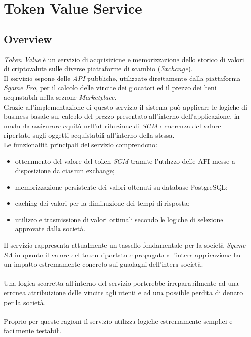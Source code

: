 \documentclass[11pt]{thesistemp}
\begin{document}
\section{Token Value Service}

\subsection{Overview}

\textit{Token Value} è un servizio di acquisizione e memorizzazione dello storico di valori di criptovalute sulle diverse piattaforme di scambio (\textit{Exchange}).\\
Il servizio espone delle \textit{API} pubbliche, utilizzate direttamente dalla piattaforma \textit{Sgame Pro}, per il calcolo delle vincite dei giocatori ed il prezzo dei beni acquistabili nella sezione \textit{Marketplace}. \\
Grazie all'implementazione di questo servizio il sistema può applicare le logiche di business basate sul calcolo del prezzo presentato all'interno dell'applicazione, in modo da assicurare equità nell'attribuzione di \textit{SGM} e coerenza del valore riportato sugli oggetti acquistabili all'interno della stessa.\\
Le funzionalità principali del servizio comprendono:
\begin{itemize}
	\item ottenimento del valore del token \textit{SGM} tramite l'utilizzo delle API messe a disposizione da ciascun exchange;
	\item memorizzazione persistente dei valori ottenuti su database PostgreSQL;
	\item caching dei valori per la diminuzione dei tempi di risposta;
	\item utilizzo e trasmissione di valori ottimali secondo le logiche di selezione approvate dalla società.
\end{itemize}
Il servizio rappresenta attualmente un tassello fondamentale per la società \textit{Sgame SA} in quanto il valore del token riportato e propagato all'intera applicazione ha un impatto estremamente concreto sui guadagni dell'intera società.\\\\
Una logica scorretta all'interno del servizio porterebbe irreparabilmente ad una erronea attribuizione delle vincite agli utenti e ad una possible perdita di denaro per la società.\\\\
Proprio per queste ragioni il servizio utilizza logiche estremamente semplici e facilmente testabili.
\pagebreak
\end{document}
